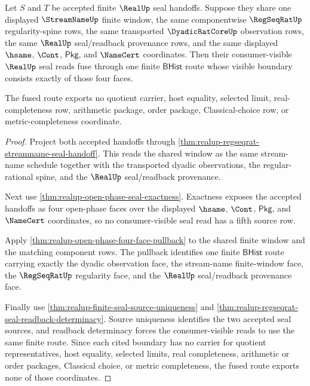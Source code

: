 \begin{theorem}
\label{thm:real-regseqrat-streamname-seal-common-window-fusion}
Let $S$ and $T$ be accepted finite $\RealUp$ seal handoffs. Suppose they share
one displayed $\StreamNameUp$ finite window, the same componentwise
$\RegSeqRatUp$ regularity-spine rows, the same transported $\DyadicRatCoreUp$
observation rows, the same $\RealUp$ seal/readback provenance rows, and the
same displayed $\hsame$, $\Cont$, $\mathsf{Pkg}$, and $\NameCert$ coordinates.
Then their consumer-visible $\RealUp$ seal reads fuse through one finite
$\mathsf{BHist}$ route whose visible boundary consists exactly of those four
faces.

The fused route exports no quotient carrier, host equality, selected limit,
real-completeness row, arithmetic package, order package, Classical-choice
row, or metric-completeness coordinate.
\end{theorem}
\begin{proof}
Project both accepted handoffs through
\autoref{thm:realup-regseqrat-streamname-seal-handoff}. This reads the shared
window as the same stream-name schedule together with the transported dyadic
observations, the regular-rational spine, and the $\RealUp$ seal/readback
provenance.

Next use \autoref{thm:realup-open-phase-seal-exactness}. Exactness exposes
the accepted handoffs as four open-phase faces over the displayed $\hsame$,
$\Cont$, $\mathsf{Pkg}$, and $\NameCert$ coordinates, so no consumer-visible
seal read has a fifth source row.

Apply \autoref{thm:realup-open-phase-four-face-pullback} to the shared finite
window and the matching component rows. The pullback identifies one finite
$\mathsf{BHist}$ route carrying exactly the dyadic observation face, the
stream-name finite-window face, the $\RegSeqRatUp$ regularity face, and the
$\RealUp$ seal/readback provenance face.

Finally use \autoref{thm:realup-finite-seal-source-uniqueness} and
\autoref{thm:realup-regseqrat-seal-readback-determinacy}. Source uniqueness
identifies the two accepted seal sources, and readback determinacy forces the
consumer-visible reads to use the same finite route. Since each cited boundary
has no carrier for quotient representatives, host equality, selected limits,
real completeness, arithmetic or order packages, Classical choice, or metric
completeness, the fused route exports none of those coordinates.
\end{proof}

